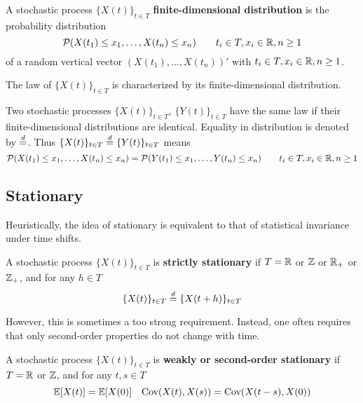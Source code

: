 \begin{definition}
	A stochastic process $\{X(t)\}_{t \in T}$ \textbf{finite-dimensional distribution} is the probability distribution
	\begin{equation*}
		\mathcal{P}(X(t_1) \le x_1, \dots, X(t_n) \le x_n) \qquad t_i \in T, x_i \in \mathbb{R}, n \ge 1
	\end{equation*} 
	of a random vertical vector $(X(t_1), \dots, X(t_n))'$ with $t_i \in T, x_i \in \mathbb{R}, n \ge 1$. 
\end{definition}

The law of $\{X(t)\}_{t \in T}$ is characterized by its finite-dimensional distribution.

Two stochastic processes $\{X(t)\}_{t \in T}$, $\{Y(t)\}_{t \in T}$ have the same law if their finite-dimensional distributions are identical. Equality in distribution is denoted by $\overset{d}{=}$. Thus $\{X(t)\}_{t \in T} \overset{d}{=} \{Y(t)\}_{t \in T}$ means
\begin{equation*}
	\mathcal{P}(X(t_1) \le x_1, \dots, X(t_n) \le x_n) = \mathcal{P}(Y(t_1) \le x_1, \dots, Y(t_n) \le x_n) \qquad t_i \in T, x_i \in \mathbb{R}, n \ge 1
\end{equation*} 

\subsection{Stationary}
Heuristically, the idea of stationary is equivalent to that of statistical invariance under time shifts.
\begin{definition}\label{def:strictstationary} 
	A stochastic process $\{X (t)\}_{t \in T}$ is \textbf{strictly stationary} if $T = \mathbb{R}$ or $\mathbb{Z}$ or $\mathbb{R}_+$ or $\mathbb{Z}_+$, and for any $h \in T$
	\begin{equation*}
		\{X(t)\}_{t \in T} \overset{d}{=} \{X(t + h)\}_{t \in T} 
	\end{equation*}
\end{definition}

However, this is sometimes a too strong requirement. Instead, one often requires that only second-order properties do not change with time.
\begin{definition}
	A stochastic process $\{X (t)\}_{t \in T}$ is \textbf{weakly or second-order stationary} if $T = \mathbb{R}$ or $\mathbb{Z}$, and for any $t, s \in T$
	\begin{equation*}
		\mathbb{E}[X(t)] = \mathbb{E}[X(0)] \quad \textnormal{Cov}(X(t), X(s)) = \textnormal{Cov}(X(t-s), X(0))
	\end{equation*}
\end{definition}

